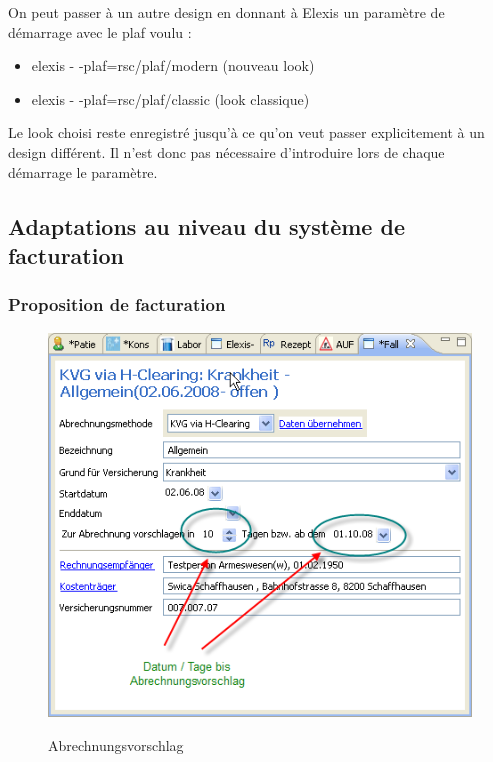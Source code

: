 \documentclass[a4paper]{scrartcl}
\begin{document}
\bigskip
On peut passer à un autre design en donnant à Elexis un paramètre de démarrage avec le plaf voulu :

\begin{itemize}
\item elexis - -plaf=rsc/plaf/modern  (nouveau look)
\item elexis - -plaf=rsc/plaf/classic (look classique)
\end{itemize}

Le look choisi reste enregistré jusqu'à ce qu'on veut passer explicitement à un design différent. Il n'est donc pas nécessaire d'introduire lors de chaque démarrage le paramètre.

\subsection{Adaptations au niveau du système de facturation}
\subsubsection{Proposition de facturation}
\begin{figure}
  \includegraphics{abrvor1}\\
  \caption{Abrechnungsvorschlag}\label{fig:abrvor1}
\end{figure}
\end{document}
